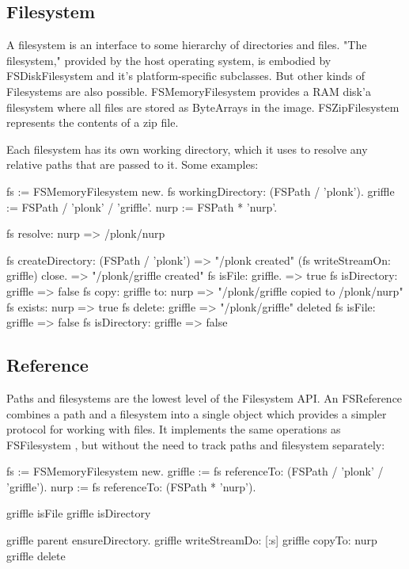 \documentclass[a4paper,10pt,twoside]{book}
\begin{document}
\subsection{Filesystem}

A filesystem is an interface to some hierarchy of directories and files. "The filesystem," provided by the host operating system, is embodied by FSDiskFilesystem and it's platform-specific subclasses. But other kinds of Filesystems are also possible. FSMemoryFilesystem provides a RAM disk'a filesystem where all files are stored as ByteArrays in the image. FSZipFilesystem represents the contents of a zip file.

Each filesystem has its own working directory, which it uses to resolve any relative paths that are passed to it. Some examples:

\begin{code}{}
    fs := FSMemoryFilesystem new.
    fs workingDirectory: (FSPath / 'plonk').
    griffle := FSPath / 'plonk' / 'griffle'.
    nurp := FSPath * 'nurp'.
    
    fs resolve: nurp            => /plonk/nurp
    
    fs createDirectory: (FSPath / 'plonk')  => "/plonk created"
    (fs writeStreamOn: griffle) close.  => "/plonk/griffle created"
    fs isFile: griffle.         => true
    fs isDirectory: griffle         => false
    fs copy: griffle to: nurp       => "/plonk/griffle copied to /plonk/nurp"
    fs exists: nurp             => true
    fs delete: griffle          => "/plonk/griffle" deleted
    fs isFile: griffle          => false
    fs isDirectory: griffle         => false
\end{code}
	
\subsection{Reference}

Paths and filesystems are the lowest level of the Filesystem API. An FSReference combines a path and a filesystem into a single object which provides a simpler protocol for working with files. It implements the same operations as FSFilesystem , but without the need to track paths and filesystem separately:


\begin{code}{}
    fs := FSMemoryFilesystem new.
    griffle := fs referenceTo: (FSPath / 'plonk' / 'griffle').
    nurp := fs referenceTo: (FSPath * 'nurp').
    
    griffle isFile              
    griffle isDirectory 
    
    griffle parent ensureDirectory.     
    griffle writeStreamDo: [:s]         
    griffle copyTo: nurp            
    griffle delete              
\end{code}    
\end{document}
